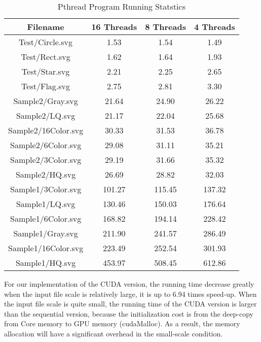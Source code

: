 \documentclass[10pt,twocolumn,letterpaper]{article}
\numberwithin{figure}{section}
\begin{document}
\begin{table*}[ht]\centering\begin{center}
\begin{tabular}{cccc}
Filename & 16 Threads & 8 Threads & 4 Threads \\
\hline

Test/Circle.svg & 1.53 & 1.54 & 1.49 \\
Test/Rect.svg & 1.62 & 1.64 & 1.93 \\
Test/Star.svg & 2.21 & 2.25 & 2.65 \\
Test/Flag.svg & 2.75 & 2.81 & 3.30 \\
Sample2/Gray.svg & 21.64 & 24.90 & 26.22 \\
Sample2/LQ.svg & 21.17 & 22.04 & 25.68 \\
Sample2/16Color.svg & 30.33 & 31.53 & 36.78 \\
Sample2/6Color.svg & 29.08 & 31.11 & 35.21 \\
Sample2/3Color.svg & 29.19 & 31.66 & 35.32 \\
Sample2/HQ.svg & 26.69 & 28.82 & 32.03 \\
Sample1/3Color.svg & 101.27 & 115.45 & 137.32 \\
Sample1/LQ.svg & 130.46 & 150.03 & 176.64 \\
Sample1/6Color.svg & 168.82 & 194.14 & 228.42 \\
Sample1/Gray.svg & 211.90 & 241.57 & 286.49 \\
Sample1/16Color.svg & 223.49 & 252.54 & 301.93 \\
Sample1/HQ.svg & 453.97 & 508.45 & 612.86 \\
\hline
\end{tabular}\end{center}\caption{Pthread Program Running Statstics}\label{result table}
\end{table*}

For our implementation of the CUDA version, the running time decrease greatly when the input file scale is relatively large, it is up to 6.94 times speed-up. When the input file scale is quite small, the running time of the CUDA version is larger than the sequential version, because the initialization cost is from the deep-copy from Core memory to GPU memory (cudaMalloc). As a result, the memory allocation will have a significant overhead in the small-scale condition.
\end{document}
